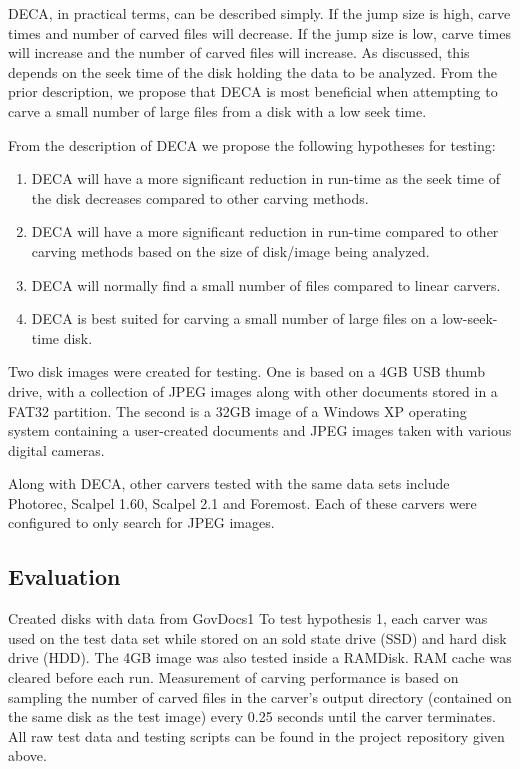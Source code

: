 \documentclass[10pt,a4paper]{article}
\begin{document}
DECA, in practical terms, can be described simply. If the jump size is high, carve times and number of carved files will decrease. If the jump size is low, carve times will increase and the number of carved files will increase. As discussed, this depends on the seek time of the disk holding the data to be analyzed. From the prior description, we propose that DECA is most beneficial when attempting to carve a small number of large files from a disk with a low seek time.

From the description of DECA we propose the following hypotheses for testing:
\begin{enumerate}
	\item DECA will have a more significant reduction in run-time as the seek time of the disk decreases compared to other carving methods.
	\item DECA will have a more significant reduction in run-time compared to other carving methods based on the size of disk/image being analyzed.
	\item DECA will normally find a small number of files compared to linear carvers.
	\item DECA is best suited for carving a small number of large files on a low-seek-time disk.
\end{enumerate}

Two disk images were created for testing. One is based on a 4GB USB thumb drive, with a collection of JPEG images along with other documents stored in a FAT32 partition. The second is a 32GB image of a Windows XP operating system containing a user-created documents and JPEG images taken with various digital cameras.

Along with DECA, other carvers tested with the same data sets include Photorec, Scalpel 1.60, Scalpel 2.1 and Foremost. Each of these carvers were configured to only search for JPEG images.

\subsection{Evaluation}
Created disks with data from GovDocs1 \cite{Garfinkel2009}
To test hypothesis 1, each carver was used on the test data set while stored on an sold state drive (SSD) and hard disk drive (HDD). The 4GB image was also tested inside a RAMDisk. RAM cache was cleared before each run. Measurement of carving performance is based on sampling the number of carved files in the carver's output directory (contained on the same disk as the test image) every 0.25 seconds until the carver terminates. All raw test data and testing scripts can be found in the project repository given above.
\end{document}
